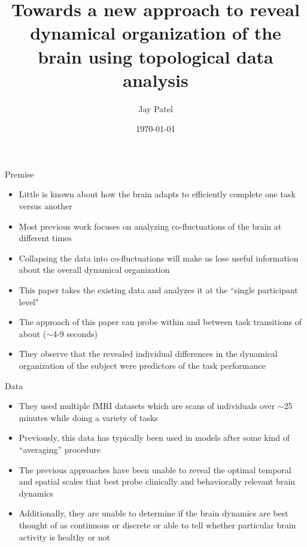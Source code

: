\documentclass{beamer}
\title[Dynamical organization of brain using TDA]{Towards a new approach to reveal dynamical
organization of the brain using topological data analysis} %
\author{Jay Patel} %
\institute[OSU] %
{
The Ohio State University \\ %
\medskip
\textit{patel.3316@osu.edu} %
}
\date{\today} %
\begin{document}
\begin{frame}
    \nocite{mainpaper}
    \titlepage %
\end{frame}

\begin{frame}{Premise}
    \begin{itemize}
        \item Little is known about how the brain adapts to efficiently complete one task versus another \pause
        \item Most previous work focuses on analyzing co-fluctuations of the brain at different times\cite{oldDataCollapsed}\pause
        \item Collapsing the data into co-fluctuations will make us lose useful information about the overall dynamical organization \pause
        \item This paper takes the existing data and analyzes it at the ``single participant level" \pause
        \item The approach of this paper can probe within and between task transitions of about ($\sim$4-9 seconds) \pause
        \item They observe that the revealed individual differences in the dynamical organization of the subject were predictors of the task performance
    \end{itemize}
\end{frame}

\begin{frame}{Data}
    \begin{itemize}
        \item They used multiple fMRI datasets which are scans of individuals over $\sim$25  minutes while doing a variety of tasks \pause
        \item Previously, this data has typically been used in models after some kind of ``averaging'' procedure \pause
        \item The previous approaches have been unable to reveal the optimal temporal and spatial scales that best probe clinically and behaviorally relevant brain dynamics \pause
        \item Additionally, they are unable to determine if the brain dynamics are best thought of as continuous or discrete or able to tell whether particular brain activity is healthy or not
    \end{itemize}
\end{frame}
\end{document}
